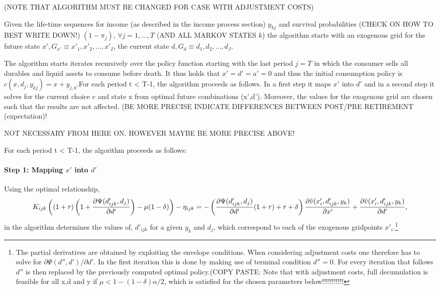 \documentclass[a4paper,12pt]{article}
\begin{document}
(NOTE THAT ALGORITHM MUST BE CHANGED FOR CASE WITH ADJUSTMENT COSTS)

Given the life-time sequences for income (as described in the income process section) {$y_{kj}$} and survival probabilities (CHECK ON HOW TO BEST WRITE DOWN!) {$(1-\pi_{j})$}, $\forall j = 1,...,T $ (AND ALL MARKOV STATES $k$) the algorithm starts with an exogenous grid for the future state $x', G_{x'} \equiv {x'_{1},x'_{2},...,x'_{I}}$, the current state $d, G_{d} \equiv {d_{1},d_{2},...,d_{J}}$.

The algorithm starts iterates recursively over the policy function starting with the last period $j=T$ in which the consumer sells all durables and liquid assets to consume before death. It thus holds that $x'=d'=a'=0$ and thus the initial consumption policy is $c(x,d_{j},y_{kj})=x+y_{j,k}$.For each period t < T-1, the algorithm proceeds as follows. In a first step it maps $x'$ into $d'$ and in a second step it solves for the current choice c and state x from optimal future combinations (x',d'). Moreover, the values for the exogenous grid are chosen such that the results are not affected. (BE MORE PRECISE
INDICATE DIFFERENCES BETWEEN POST/PRE RETIREMENT (expectation)!




NOT NECESSARY FROM HERE ON. HOWEVER MAYBE BE MORE PRECISE ABOVE!


For each period t < T-1, the algorithm proceeds as follows: 

\paragraph{Step 1: Mapping $x'$ into $d'$} 

Using the optimal relationship,
\begin{equation} \label{eq:optimal_algorithm}
\tiny
K_{ijk}\left((1+r)\left(1+\frac{\partial \Psi(d'_{ijk},d_{j})}{\partial d'}\right)-\mu(1-\delta)\right)-\eta_{ijk} = -\left(\frac{\partial \Psi(d'_{ijk},d_{j})}{\partial d'}(1+r)+r+\delta \right) \frac{\partial \hat{v}(x'_{i},d'_{ijk},y_{k})}{\partial x'}+\frac{\partial \hat{v}(x'_{i},d'_{ijk},y_{k})}{\partial d'},
\end{equation}
in the algorithm determines the values of, $d'_{ijk}$ for a given $y_{k}$ and $d_{j}$, which correspond to each of the exogenous gridpoints $x'_{i}$.\footnote{The partial derivatives are obtained by exploiting the envelope conditions. When considering adjustment costs one therefore has to solve for $\partial \Psi(d'',d') /\partial d'$. In the first iteration this is done by making use of terminal condition $d''=0$. For every iteration that follows $d''$ is then replaced by the previously computed optimal policy.(COPY PASTE: Note that with adjustment costs, full decumulation is feasible for all x,d and y if $\mu < 1-(1-\delta)\alpha/2$, which is satisfied for the chosen parameters below!!!!!!!!!!!}
\end{document}
